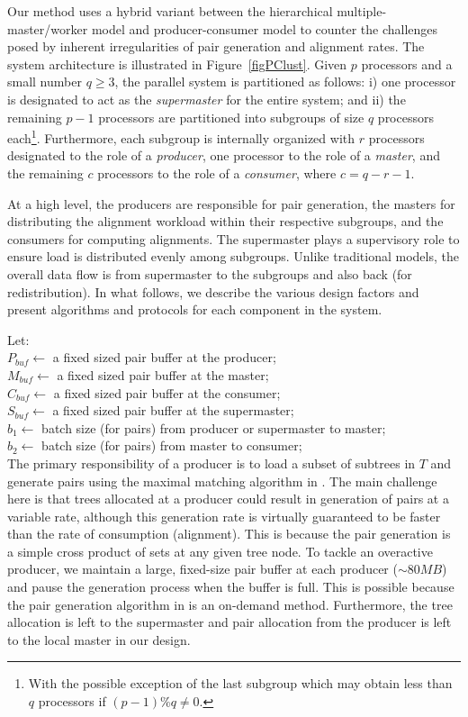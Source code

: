\documentclass[10pt,journal,letterpaper,compsoc]{IEEEtran}
\begin{document}
Our method uses a hybrid variant between the hierarchical multiple-master/worker model and producer-consumer model to counter the challenges posed by inherent irregularities of pair generation and alignment rates. 
The system architecture is illustrated in Figure~\ref{figPClust}.  Given $p$ processors and a small number $q\geq 3$, the parallel system is partitioned as follows: i) one processor is designated to act as the \emph{supermaster} for the entire system; and ii) the remaining $p-1$ processors are partitioned into subgroups of size $q$ processors each\footnote{With the possible exception of the last subgroup which may obtain less than $q$ processors if $(p-1)\%q\ne 0$.}. Furthermore, each subgroup is internally organized with $r$ processors designated to the role of a \emph{producer}, one processor to the role of a \emph{master}, and the remaining $c$ processors to the role of a \emph{consumer}, where $c=q-r-1$. 

At a high level, the producers are responsible for pair generation, the masters for distributing the alignment workload within their respective subgroups, and the consumers for computing alignments. The supermaster plays a supervisory role to ensure load is distributed evenly among subgroups. Unlike traditional models, the overall data flow is from supermaster to the subgroups and also back (for redistribution). In what follows, we describe the various design factors and present algorithms and protocols for each component in the system. 

Let:\\
$P_{buf}\leftarrow$ a fixed sized pair buffer at the producer;\\
$M_{buf}\leftarrow$ a fixed sized pair buffer at the master;\\
$C_{buf}\leftarrow$ a fixed sized pair buffer at the consumer;\\
$S_{buf}\leftarrow$ a fixed sized pair buffer at the supermaster;\\
$b_1\leftarrow$ batch size (for pairs) from producer or supermaster to master;\\
$b_2\leftarrow$ batch size (for pairs) from master to consumer;\\


The primary responsibility of a producer is to load a subset of subtrees in $T$ and generate pairs using the maximal matching algorithm in \cite{KalyanaramanJPDC07}. The main challenge here is that trees allocated at a producer could result in generation of pairs at a variable rate, although this generation rate is virtually guaranteed to be faster than the rate of consumption (alignment). This is because the pair generation is a simple cross product of sets at any given tree node. To tackle an overactive producer, we maintain a large, fixed-size pair buffer at each producer ($\sim 80MB$) and pause the generation process when the buffer is full. This is possible because the pair generation algorithm in \cite{KalyanaramanJPDC07} is an on-demand method. Furthermore, the tree allocation is left to the supermaster and pair allocation from the producer is left to the local master in our design. 
\end{document}
